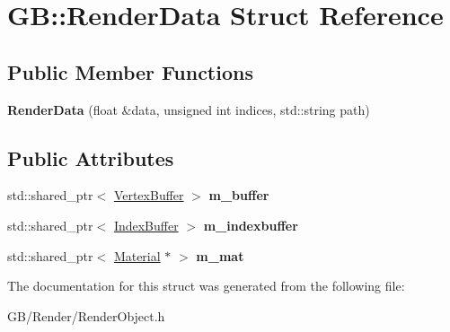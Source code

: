 \hypertarget{struct_g_b_1_1_render_data}{}\section{GB\+::Render\+Data Struct Reference}
\label{struct_g_b_1_1_render_data}
\subsection*{Public Member Functions}
\begin{DoxyCompactItemize}
\item 
\mbox{\label{struct_g_b_1_1_render_data_a2236c3b18ca12ecbd5b87d70df1c349d}} 
{\bfseries Render\+Data} (float \&data, unsigned int indices, std\+::string path)
\end{DoxyCompactItemize}
\subsection*{Public Attributes}
\begin{DoxyCompactItemize}
\item 
\mbox{\label{struct_g_b_1_1_render_data_adf9e48e8626c223965badc97d203a0f0}} 
std\+::shared\+\_\+ptr$<$ \mbox{\hyperlink{class_g_b_1_1_vertex_buffer}{Vertex\+Buffer}} $>$ {\bfseries m\+\_\+buffer}
\item 
\mbox{\label{struct_g_b_1_1_render_data_aa49d141d7a2c5bf18ca4afcabc8848bb}} 
std\+::shared\+\_\+ptr$<$ \mbox{\hyperlink{class_g_b_1_1_index_buffer}{Index\+Buffer}} $>$ {\bfseries m\+\_\+indexbuffer}
\item 
\mbox{\label{struct_g_b_1_1_render_data_a9b7098cf28f7884769ae732001671b4c}} 
std\+::shared\+\_\+ptr$<$ \mbox{\hyperlink{class_g_b_1_1_material}{Material}} $\ast$ $>$ {\bfseries m\+\_\+mat}
\end{DoxyCompactItemize}


The documentation for this struct was generated from the following file\+:\begin{DoxyCompactItemize}
\item 
G\+B/\+Render/Render\+Object.\+h\end{DoxyCompactItemize}

